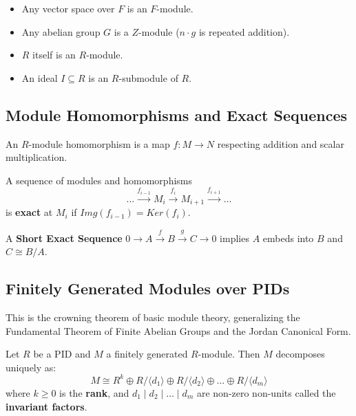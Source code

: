 \begin{example}
\begin{itemize}
    \item Any vector space over $F$ is an $F$-module.
    \item Any abelian group $G$ is a $Z$-module ($n \cdot g$ is repeated addition).
    \item $R$ itself is an $R$-module.
    \item An ideal $I \subseteq R$ is an $R$-submodule of $R$.
\end{itemize}
\end{example}

\subsection{Module Homomorphisms and Exact Sequences}

\begin{definition}
An $R$-module homomorphism is a map $f: M \to N$ respecting addition and scalar multiplication.
\end{definition}

\begin{definition}
A sequence of modules and homomorphisms
\[ \dots \xrightarrow{f_{i-1}} M_{i} \xrightarrow{f_i} M_{i+1} \xrightarrow{f_{i+1}} \dots \]
is \textbf{exact} at $M_i$ if $Img(f_{i-1}) = Ker(f_i)$.
\end{definition}

A \textbf{Short Exact Sequence} $0 \to A \xrightarrow{f} B \xrightarrow{g} C \to 0$ implies $A$ embeds into $B$ and $C \cong B/A$.

\subsection{Finitely Generated Modules over PIDs}

This is the crowning theorem of basic module theory, generalizing the Fundamental Theorem of Finite Abelian Groups and the Jordan Canonical Form.

\begin{theorem}
Let $R$ be a PID and $M$ a finitely generated $R$-module. Then $M$ decomposes uniquely as:
\[ M \cong R^k \oplus R/\langle d_1 \rangle \oplus R/\langle d_2 \rangle \oplus \dots \oplus R/\langle d_m \rangle \]
where $k \geq 0$ is the \textbf{rank}, and $d_1 \mid d_2 \mid \dots \mid d_m$ are non-zero non-units called the \textbf{invariant factors}.
\end{theorem}

\cleardoublepage